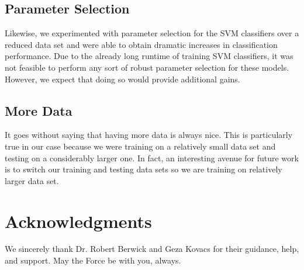 \documentclass[preprint]{style}
\begin{document}
\subsection{Parameter Selection}
Likewise, we experimented with parameter selection for the SVM classifiers over a reduced data set and were able to obtain dramatic increases in classification performance. Due to the already long runtime of training SVM classifiers, it was not feasible to perform any sort of robust parameter selection for these models. However, we expect that doing so would provide additional gains.

\subsection{More Data}

It goes without saying that having more data is always nice. This is particularly true in our case because we were training on a relatively small data set and testing on a considerably larger one. In fact, an interesting avenue for future work is to switch our training and testing data sets so we are training on relatively larger data set.
	
\section{Acknowledgments}

We sincerely thank Dr. Robert Berwick  and Geza Kovacs
for their guidance, help, and support. May the Force be with you,
always.



%


\balancecolumns
\end{document}
